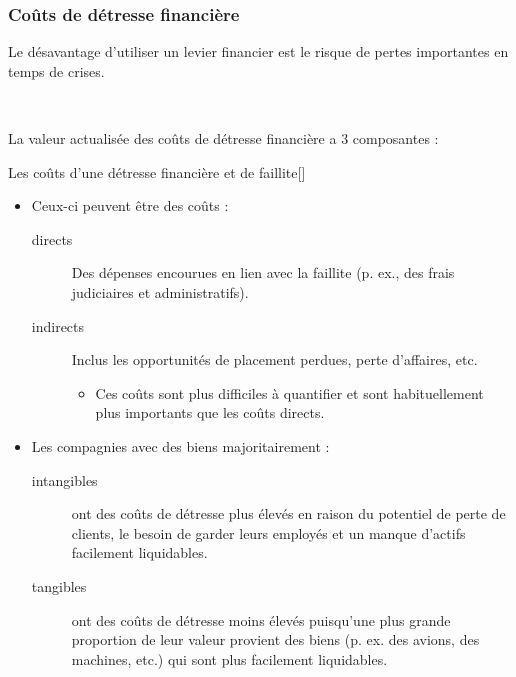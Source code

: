 \documentclass[10pt, french]{article}
\begin{document}
\begin{multicols*}{2}
\begin{center}
\end{center}


\columnbreak
\subsubsection{Coûts de détresse financière}
Le désavantage d'utiliser un levier financier est le risque de pertes importantes en temps de crises.

\

La valeur actualisée des coûts de détresse financière a 3 composantes : 

\begin{definitionGENERAL}{Les coûts d'une détresse financière et de faillite}[]
\begin{itemize}
	\item	Ceux-ci peuvent être des coûts :
		\begin{description}
		\item[directs]	Des dépenses encourues en lien avec la faillite (p. ex., des frais judiciaires et administratifs).
		\item[indirects]	Inclus les opportunités de placement perdues, perte d'affaires, etc.
			\begin{itemize}
			\item	Ces coûts sont plus difficiles à quantifier et sont habituellement plus importants que les coûts directs.
			\end{itemize}
		\end{description}
	\item	Les compagnies avec des biens majoritairement : 
		\begin{description}
		\item[intangibles]	ont des coûts de détresse plus élevés en raison du potentiel de perte de clients, le besoin de garder leurs employés et un manque d'actifs facilement liquidables.
		\item[tangibles]	ont des coûts de détresse moins élevés puisqu'une plus grande proportion de leur valeur provient des biens (p. ex. des avions, des machines, etc.) qui sont plus facilement liquidables.	
	\end{description}
\end{itemize}
\end{definitionGENERAL}


\end{multicols*}
\end{document}

